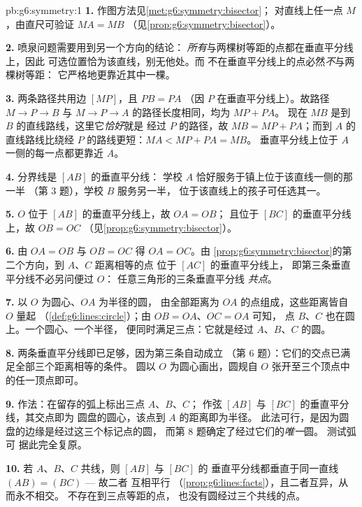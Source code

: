 \begin{solution}{pb:g6:symmetry:1}
\textbf{1.} 作图方法见\cref{met:g6:symmetry:bisector}；
对直线上任一点 $M$，由直尺可验证 $MA = MB$
（见\cref{prop:g6:symmetry:bisector}）。

\textbf{2.} 喷泉问题需要用到另一个方向的结论：
\emph{所有}与两棵树等距的点都在垂直平分线上，因此
可选位置恰为该直线，别无他处。而
不在垂直平分线上的点必然\emph{不}与两棵树等距：
它严格地更靠近其中一棵。

\textbf{3.} 两条路径共用边 $[MP]$，且 $PB = PA$
（因 $P$ 在垂直平分线上）。故路径 $M \to P \to B$ 与
$M \to P \to A$ 的路径长度相同，均为 $MP + PA$。
现在 $MB$ 是到 $B$ 的直线路线，这里它\emph{恰好}就是
经过 $P$ 的路径，故 $MB = MP + PA$；而到
$A$ 的直线路线比绕经 $P$ 的路线更短：$MA < MP + PA = MB$。
垂直平分线上位于 $A$ 一侧的每一点都更靠近 $A$。

\textbf{4.} 分界线是 $[AB]$ 的垂直平分线：
学校 $A$ 恰好服务于镇上位于该直线一侧的那一半
（第 3 题），学校 $B$ 服务另一半，
位于该直线上的孩子可任选其一。

\textbf{5.} $O$ 位于 $[AB]$ 的垂直平分线上，故 $OA = OB$；
且位于 $[BC]$ 的垂直平分线上，故 $OB = OC$
（见\cref{prop:g6:symmetry:bisector}）。

\textbf{6.} 由 $OA = OB$ 与 $OB = OC$ 得 $OA = OC$。由
\cref{prop:g6:symmetry:bisector}的第二个方向，到 $A$、$C$ 距离相等的点
位于 $[AC]$ 的垂直平分线上，
即第三条垂直平分线不必另问便过 $O$：
任意三角形的三条垂直平分线
\emph{共点}。

\textbf{7.} 以 $O$ 为圆心、$OA$ 为半径的圆，
由全部距离为 $OA$ 的点组成，这些距离皆自 $O$ 量起
（\cref{def:g6:lines:circle}）；由 $OB = OA$、$OC = OA$ 可知，
点 $B$、$C$ 也在圆上。一个圆心、一个半径，
便同时满足三点：它就是经过 $A$、$B$、$C$ 的圆。

\textbf{8.} 两条垂直平分线即已足够，因为第三条自动成立
（第 6 题）：它们的交点已满足全部三个距离相等的条件。
圆以 $O$ 为圆心画出，圆规自 $O$ 张开至三个顶点中
的任一顶点即可。

\textbf{9.} 作法：在留存的弧上标出三点 $A$、$B$、$C$；
作弦 $[AB]$ 与 $[BC]$ 的垂直平分线，其交点即为
圆盘的圆心，该点到 $A$ 的距离即为半径。
此法可行，是因为圆盘的边缘是经过这三个标记点的圆，
而第 8 题确定了经过它们的\emph{唯一}圆。
测试弧可
据此完全复原。

\textbf{10.} 若 $A$、$B$、$C$ 共线，则 $[AB]$ 与 $[BC]$ 的
垂直平分线都垂直于同一直线 $(AB) = (BC)$ --- 故二者
互相平行
（\cref{prop:g6:lines:facts}），且二者互异，从而永不相交。
不存在到三点等距的点，
也没有圆经过三个共线的点。


\end{solution}
